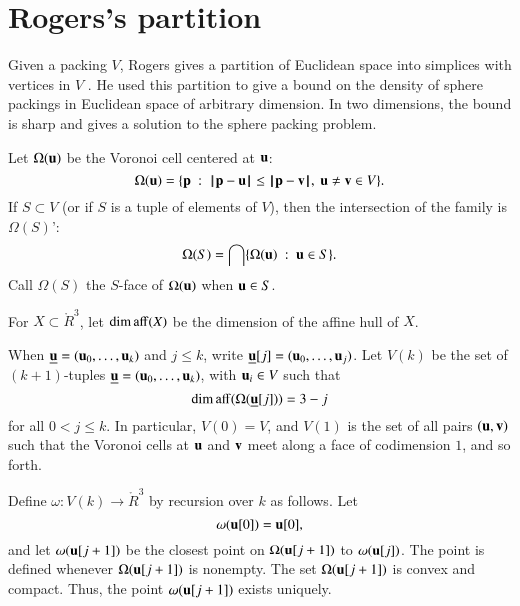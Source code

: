 \section{Rogers's partition}\label{sec:rogers}





Given a packing $ V$, Rogers gives a partition of Euclidean space into
simplices with vertices in $ V$ \cite{Rogers:1958:Packing}.   He used this partition
to give a bound on the density of sphere packings in Euclidean space of arbitrary dimension.
In two dimensions, the bound is sharp and gives a solution to the sphere packing problem.

Let $\Omega( {\mathbf u})$  be the Voronoi cell centered at $ {\mathbf u}$:
$$
  \Omega( {\mathbf u}) = \{{\mathbf p} \ :\   {\hskip0.1em|\hskip-0.15em|\hskip0.1em}{\mathbf p} -  {\mathbf u}{\hskip0.1em|\hskip-0.15em|\hskip0.1em} 
\le {\hskip0.1em|\hskip-0.15em|\hskip0.1em}{\mathbf p} - {\mathbf v}{\hskip0.1em|\hskip-0.15em|\hskip0.1em},\  {\mathbf u}\ne{\mathbf v}\in V\}.
$$
If $S\subset V$ (or if $S$ is a tuple of elements of $ V$), 
then the intersection of the family is  $\Omega(S)$':
$$\Omega(S)  = \bigcap \{\Omega( {\mathbf u})\ :\   {\mathbf u}\in S \}.$$
Call $\Omega(S)$ the $S$-face of $\Omega( {\mathbf u})$ when $ {\mathbf u}\in S$.

For $X\subset\ring{R}^3$,  let $\operatorname{dim\,aff}(X)$ be the dimension of the affine hull
of $X$.

When ${\underline{{\mathbf u}}}=( {\mathbf u}_0,\ldots, {\mathbf u}_k)$ and $j\le k$, write ${\underline{{\mathbf u}}}[j] = ( {\mathbf u}_0,\ldots, {\mathbf u}_j)$.
Let $ V(k)$ be the set of $(k\!+\!1)$-tuples ${\underline{{\mathbf u}}}=( {\mathbf u}_0,\ldots, {\mathbf u}_k)$, with
$ {\mathbf u}_i\in V$ such
that 
\begin{equation}\label{eqn:omega-dim}
\operatorname{dim\,aff}(\Omega({\underline{{\mathbf u}}}[j])) = 3-j
\end{equation}
for all $0<j\le k$.
In particular, $ V(0)= V$,   and $ V(1)$ is the
set of all pairs $( {\mathbf u},{\mathbf v})$ such that the Voronoi cells at $ {\mathbf u}$ and ${\mathbf v}$ meet along
a face of codimension $1$, and
so forth.


Define $\omega: V(k)\to \ring{R}^3$ by recursion over $k$ as follows.
Let $$\omega( {\mathbf u}[0]) =  {\mathbf u}[0],$$
and let $\omega( {\mathbf u}[j+1])$ be the closest point on $\Omega( {\mathbf u}[j+1])$ to $\omega( {\mathbf u}[j])$.  The point is defined whenever $\Omega( {\mathbf u}[j+1])$ is nonempty.
The set $\Omega( {\mathbf u}[j+1])$ is convex and compact.  Thus, the point $\omega( {\mathbf u}[j+1])$ exists
uniquely.
%

